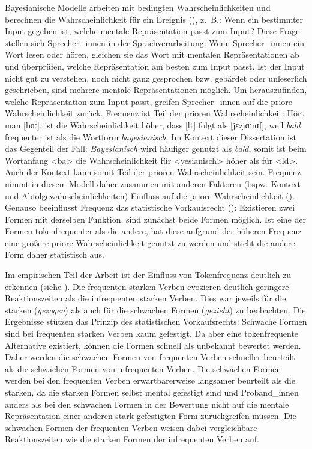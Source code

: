 \begin{sloppypar}
Bayesianische Modelle arbeiten mit bedingten Wahrscheinlichkeiten und berechnen die Wahrscheinlichkeit für ein Ereignis (\cite[330]{Norris.2006}), z.~B.: Wenn ein bestimmter Input gegeben ist, welche mentale Repräsentation passt zum Input? Diese Frage stellen sich Sprecher\_innen in der Sprachverarbeitung. Wenn Sprecher\_innen ein Wort lesen oder hören, gleichen sie das Wort mit mentalen Repräsentationen ab und überprüfen, welche Repräsentation am besten zum Input passt. Ist der Input nicht gut zu verstehen, noch nicht ganz gesprochen bzw. gebärdet oder unleserlich geschrieben, sind mehrere mentale Repräsentationen möglich. Um herauszufinden, welche Repräsentation zum Input passt, greifen Sprecher\_innen auf die priore Wahrscheinlichkeit zurück. Frequenz ist Teil der prioren Wahrscheinlichkeit: Hört man [bɑː], ist die Wahrscheinlichkeit höher, dass [lt] folgt als [jɛzjɑːnɪʃ], weil \textit{bald} frequenter ist als die Wortform \textit{bayesianisch}. Im Kontext dieser Dissertation ist das Gegenteil der Fall: \textit{Bayesianisch} wird häufiger genutzt als \textit{bald}, somit ist beim Wortanfang <ba> die Wahrscheinlichkeit für <yesianisch> höher als für <ld>. Auch der Kontext kann somit Teil der prioren Wahrscheinlichkeit sein. Frequenz nimmt in diesem Modell daher zusammen mit anderen Faktoren (bspw. Kontext und Abfolgewahrscheinlichkeiten) Einfluss auf die priore Wahrscheinlichkeit (\cite[330--331]{Norris.2006}). Genauso beeinflusst Frequenz das statistische Vorkaufsrecht (\cite[75--77]{Goldberg.2019}): Existieren zwei Formen mit derselben Funktion, sind zunächst beide Formen möglich. Ist eine der Formen tokenfrequenter als die andere, hat diese aufgrund der höheren Frequenz eine größere priore Wahrscheinlichkeit genutzt zu werden und sticht die andere Form daher statistisch aus.
\end{sloppypar}

Im empirischen Teil der Arbeit ist der Einfluss von Tokenfrequenz deutlich zu erkennen (siehe ). Die frequenten starken Verben evozieren deutlich geringere Reaktionszeiten als die infrequenten starken Verben. Dies war jeweils für die starken (\textit{gezogen}) als auch für die schwachen Formen (\textit{gezieht}) zu beobachten. Die Ergebnisse stützen das Prinzip des statistischen Vorkaufsrechts: Schwache Formen sind bei frequenten starken Verben kaum gefestigt. Da aber eine tokenfrequente Alternative existiert, können die Formen schnell als unbekannt bewertet werden. Daher werden die schwachen Formen von frequenten Verben schneller beurteilt als die schwachen Formen von infrequenten Verben. Die schwachen Formen werden bei den frequenten Verben erwartbarerweise langsamer beurteilt als die starken, da die starken Formen selbst mental gefestigt sind und Proband\_innen anders als bei den schwachen Formen in der Bewertung nicht auf die mentale Repräsentation einer anderen stark gefestigten Form zurückgreifen müssen. Die schwachen Formen der frequenten Verben weisen dabei vergleichbare Reaktionszeiten wie die starken Formen der infrequenten Verben auf.


